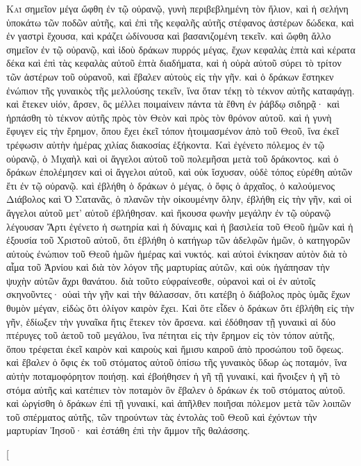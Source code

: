 \begin{pages}
    \begin{Rightside}
        \beginnumbering
		\renewcommand{\LettrineFontHook}{\PHtitl}
		\lettrine[lines=3]{Κ}{αὶ} σημεῖον μέγα ὤφθη ἐν τῷ οὐρανῷ, γυνὴ περιβεβλημένη τὸν ἥλιον, καὶ ἡ σελήνη ὑποκάτω τῶν ποδῶν αὐτῆς, καὶ ἐπὶ τῆς κεφαλῆς αὐτῆς στέφανος ἀστέρων δώδεκα, καὶ ἐν γαστρὶ ἔχουσα, καὶ κράζει ὠδίνουσα καὶ βασανιζομένη τεκεῖν. 
		\pend
		\pstart
		καὶ ὤφθη ἄλλο σημεῖον ἐν τῷ οὐρανῷ, καὶ ἰδοὺ δράκων πυρρός μέγας, ἔχων κεφαλὰς ἑπτὰ καὶ κέρατα δέκα καὶ ἐπὶ τὰς κεφαλὰς αὐτοῦ ἑπτὰ διαδήματα, καὶ ἡ οὐρὰ αὐτοῦ σύρει τὸ τρίτον τῶν ἀστέρων τοῦ οὐρανοῦ, καὶ ἔβαλεν αὐτοὺς εἰς τὴν γῆν. καὶ ὁ δράκων ἕστηκεν ἐνώπιον τῆς γυναικὸς τῆς μελλούσης τεκεῖν, ἵνα ὅταν τέκῃ τὸ τέκνον αὐτῆς καταφάγῃ. καὶ ἔτεκεν υἱόν, ἄρσεν, ὃς μέλλει ποιμαίνειν πάντα τὰ ἔθνη ἐν ῥάβδῳ σιδηρᾷ· καὶ ἡρπάσθη τὸ τέκνον αὐτῆς πρὸς τὸν Θεὸν καὶ πρὸς τὸν θρόνον αὐτοῦ.
		\pend
		\pstart
		καὶ ἡ γυνὴ ἔφυγεν εἰς τὴν ἔρημον, ὅπου ἔχει ἐκεῖ τόπον ἡτοιμασμένον ἀπὸ τοῦ Θεοῦ, ἵνα ἐκεῖ τρέφωσιν αὐτὴν ἡμέρας χιλίας διακοσίας ἑξήκοντα. Καὶ ἐγένετο πόλεμος ἐν τῷ οὐρανῷ, ὁ Μιχαὴλ καὶ οἱ ἄγγελοι αὐτοῦ τοῦ πολεμῆσαι μετὰ τοῦ δράκοντος. καὶ ὁ δράκων ἐπολέμησεν καὶ οἱ ἄγγελοι αὐτοῦ, καὶ οὐκ ἴσχυσαν, οὐδὲ τόπος εὑρέθη αὐτῶν ἔτι ἐν τῷ οὐρανῷ. 
		\pend
		\pstart
		καὶ ἐβλήθη ὁ δράκων ὁ μέγας, ὁ ὄφις ὁ ἀρχαῖος, ὁ καλούμενος Διάβολος καὶ Ὁ Σατανᾶς, ὁ πλανῶν τὴν οἰκουμένην ὅλην, ἐβλήθη εἰς τὴν γῆν, καὶ οἱ ἄγγελοι αὐτοῦ μετ’ αὐτοῦ ἐβλήθησαν. καὶ ἤκουσα φωνὴν μεγάλην ἐν τῷ οὐρανῷ λέγουσαν Ἄρτι ἐγένετο ἡ σωτηρία καὶ ἡ δύναμις καὶ ἡ βασιλεία τοῦ Θεοῦ ἡμῶν καὶ ἡ ἐξουσία τοῦ 	Χριστοῦ αὐτοῦ, ὅτι ἐβλήθη ὁ κατήγωρ τῶν ἀδελφῶν ἡμῶν, ὁ κατηγορῶν αὐτοὺς ἐνώπιον τοῦ Θεοῦ ἡμῶν ἡμέρας καὶ νυκτός. 
		\pend
		\pstart
		καὶ αὐτοὶ ἐνίκησαν αὐτὸν διὰ τὸ αἷμα τοῦ Ἀρνίου καὶ διὰ τὸν λόγον τῆς μαρτυρίας αὐτῶν, καὶ οὐκ ἠγάπησαν τὴν ψυχὴν αὐτῶν ἄχρι θανάτου. διὰ τοῦτο εὐφραίνεσθε, οὐρανοὶ καὶ οἱ ἐν αὐτοῖς σκηνοῦντες· οὐαὶ τὴν γῆν καὶ τὴν θάλασσαν, ὅτι κατέβη ὁ διάβολος πρὸς ὑμᾶς ἔχων θυμὸν μέγαν, εἰδὼς ὅτι ὀλίγον καιρὸν ἔχει.
		\pend
		\pstart
		Καὶ ὅτε εἶδεν ὁ δράκων ὅτι ἐβλήθη εἰς τὴν γῆν, ἐδίωξεν τὴν γυναῖκα ἥτις ἔτεκεν τὸν ἄρσενα. καὶ ἐδόθησαν τῇ γυναικὶ αἱ δύο πτέρυγες τοῦ ἀετοῦ τοῦ μεγάλου, ἵνα πέτηται εἰς τὴν ἔρημον εἰς τὸν τόπον αὐτῆς, ὅπου τρέφεται ἐκεῖ καιρὸν καὶ καιροὺς καὶ ἥμισυ καιροῦ ἀπὸ προσώπου τοῦ ὄφεως. 
		\pend
		\pstart
		καὶ ἔβαλεν ὁ ὄφις ἐκ τοῦ στόματος αὐτοῦ ὀπίσω τῆς γυναικὸς ὕδωρ ὡς ποταμόν, ἵνα αὐτὴν ποταμοφόρητον ποιήσῃ. καὶ ἐβοήθησεν ἡ γῆ τῇ γυναικί, καὶ ἤνοιξεν ἡ γῆ τὸ στόμα αὐτῆς καὶ κατέπιεν τὸν ποταμὸν ὃν ἔβαλεν ὁ δράκων ἐκ τοῦ στόματος αὐτοῦ. 
		\pend
		\pstart
		καὶ ὠργίσθη ὁ δράκων ἐπὶ τῇ γυναικί, καὶ ἀπῆλθεν ποιῆσαι πόλεμον μετὰ τῶν λοιπῶν τοῦ σπέρματος αὐτῆς, τῶν τηρούντων τὰς ἐντολὰς τοῦ Θεοῦ καὶ ἐχόντων τὴν μαρτυρίαν Ἰησοῦ· καὶ ἐστάθη ἐπὶ τὴν ἄμμον τῆς θαλάσσης.	
		\pend
        \endnumbering
    \end{Rightside}
    \begin{Leftside}
        \beginnumbering
        \pstart[

\end{Leftside}
\end{pages}
